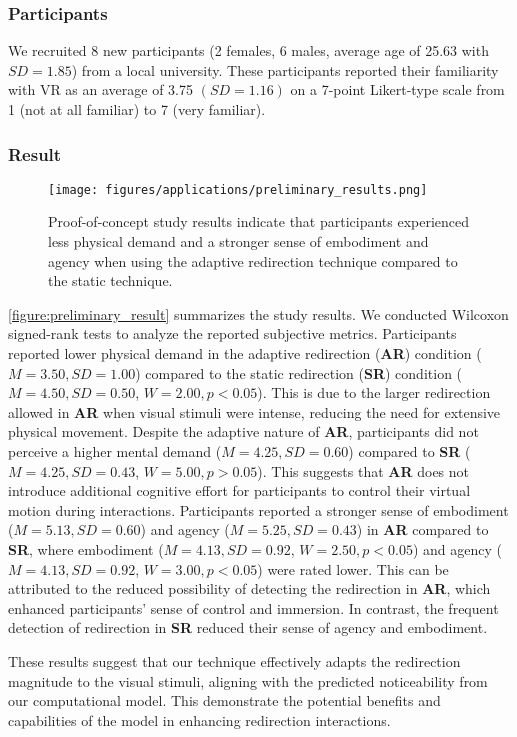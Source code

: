 \subsubsection{Participants}

We recruited 8 new participants (2 females, 6 males, average age of 25.63 with $SD=1.85$) from a local university.
These participants reported their familiarity with VR as an average of 3.75 $(SD=1.16)$ on a 7-point Likert-type scale from 1 (not at all familiar) to 7 (very familiar).

\subsubsection{Result}

\begin{figure}[t]
    \centering
    \texttt{[image: figures/applications/preliminary\_results.png]}
    \caption{Proof-of-concept study results indicate that participants experienced less physical demand and a stronger sense of embodiment and agency when using the adaptive redirection technique compared to the static technique.}
    \label{figure:preliminary_result}
\end{figure}

\autoref{figure:preliminary_result} summarizes the study results.
We conducted Wilcoxon signed-rank tests to analyze the reported subjective metrics.
Participants reported lower physical demand in the adaptive redirection (\textbf{AR}) condition ($M=3.50, SD=1.00$) compared to the static redirection (\textbf{SR}) condition ($M=4.50, SD=0.50$, $W=2.00, p<0.05$). 
This is due to the larger redirection allowed in \textbf{AR} when visual stimuli were intense, reducing the need for extensive physical movement.
Despite the adaptive nature of \textbf{AR}, participants did not perceive a higher mental demand ($M=4.25, SD=0.60$) compared to \textbf{SR} ($M=4.25, SD=0.43$, $W=5.00, p>0.05$). 
This suggests that \textbf{AR} does not introduce additional cognitive effort for participants to control their virtual motion during interactions.
Participants reported a stronger sense of embodiment ($M=5.13, SD=0.60$) and agency ($M=5.25, SD=0.43$) in \textbf{AR} compared to \textbf{SR}, where embodiment ($M=4.13, SD=0.92$, $W=2.50, p<0.05$) and agency ($M=4.13, SD=0.92$, $W=3.00, p<0.05$) were rated lower. 
This can be attributed to the reduced possibility of detecting the redirection in \textbf{AR}, which enhanced participants' sense of control and immersion. 
In contrast, the frequent detection of redirection in \textbf{SR} reduced their sense of agency and embodiment.

These results suggest that our technique effectively adapts the redirection magnitude to the visual stimuli, aligning with the predicted noticeability from our computational model. 
This demonstrate the potential benefits and capabilities of the model in enhancing redirection interactions.
